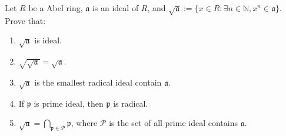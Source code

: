 \documentclass{ctexart}
\newif\ifpreface
\renewcommand{\theproblem}{\Roman{problem}}
\newcommand\<{\langle}
\renewcommand\>{\rangle}
\newcommand\N{\mathbb{N}}
\newcommand{\fra}{\mathfrak{a}}
\begin{document}
\large
\setlength{\baselineskip}{1.2em}
\ifpreface
    
\else
\maketitle
\fi
{}
\begin{problem}
    Let $R$ be a Abel ring, $\fra$ is an ideal of $R$, and $\sqrt{\fra}:=\{x\in R:\exists n\in\N,x^n\in\fra\}$. Prove that:
    \begin{enumerate}[ref=\theproblem.\arabic*]
        \item\label{it:11} $\sqrt{\mathfrak{a}}$ is ideal.
        \item\label{it:12} $\sqrt{\sqrt{\mathfrak{a}}}=\sqrt{\mathfrak{a}}$.
        \item\label{it:13} $\sqrt{\fra}$ is the smallest radical ideal contain $\mathfrak{a}$. 
        \item\label{it:14} If $\mathfrak{p}$ is prime ideal, then $\mathfrak{p}$ is radical. 
        \item\label{it:15} $\sqrt{\mathfrak{a}}=\bigcap_{\mathfrak{p}\in\mathcal{P}}\mathfrak{p}$, where $\mathcal{P}$ is the set of all prime ideal contains $\fra$. 
    \end{enumerate}
\end{problem}
\end{document}
